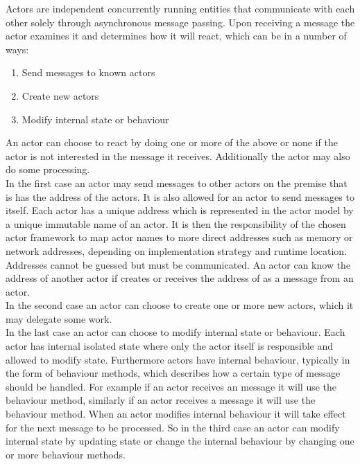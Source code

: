 Actors are independent concurrently running entities that communicate with each other solely through asynchronous message passing\cite[p. 304]{tasharofi2013scala}. Upon receiving a message the actor examines it and determines how it will react, which can be in a number of ways\cite[p. 2]{hewitt2014actor}:
\begin{enumerate}
\item Send messages to known actors
\item Create new actors
\item Modify internal state or behaviour
\end{enumerate}
An actor can choose to react by doing one or more of the above or none if the actor is not interested in the message it receives. Additionally the actor may also do some processing.\\
In the first case an actor may send messages to other actors on the premise that is has the address of the actors. It is also allowed for an actor to send messages to itself. Each actor has a unique address which is represented in the actor model by a unique immutable name of an actor\cite[p. 2]{karmani2009actor}. It is then the responsibility of the chosen actor framework to map actor names to more direct addresses such as memory or network addresses, depending on implementation strategy and runtime location\cite[p. 3]{hewitt2014actor}. Addresses cannot be guessed but must be communicated. An actor  can know the address of another actor  if  creates  or receives the address of  as a message from an actor.\\
In the second case an actor can choose to create one or more new actors, which it may delegate some work.\\
In the last case an actor can choose to modify internal state or behaviour. Each actor has internal isolated state where only the actor itself is responsible and allowed to modify state. Furthermore actors have internal behaviour, typically in the form of behaviour methods, which describes how a certain type of message should be handled. For example if an actor receives an  message it will use the  behaviour method, similarly  if an actor receives a  message it will use the  behaviour method. When an actor modifies internal behaviour it will take effect for the next message to be processed. So in the third case an actor can modify internal state by updating state or change the internal behaviour by changing one or more behaviour methods.

